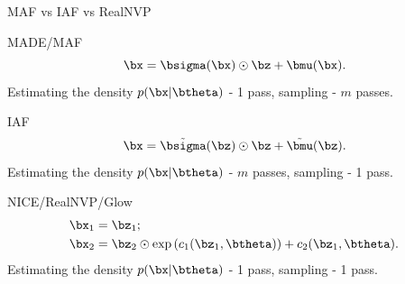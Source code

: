 \begin{frame}{MAF vs IAF vs RealNVP}
	\begin{block}{MADE/MAF}
		\vspace{-0.5cm}
		\[
		\bx = \bsigma (\bx) \odot \bz + \bmu(\bx).
		\]
		Estimating the density $p(\bx | \btheta)$ - 1 pass, sampling - $m$ passes.
	\end{block}
	\begin{block}{IAF}
		\vspace{-0.5cm}
		\[
		\bx = \tilde{\bsigma} (\bz) \odot \bz + \tilde{\bmu}(\bz).
		\]
		Estimating the density $p(\bx | \btheta)$ - $m$ passes, sampling - 1 pass.
	\end{block}
	\begin{block}{NICE/RealNVP/Glow}
		\vspace{-0.8cm}
		\begin{align*}
			\bx_1 &= \bz_1; \\ 
			\bx_2 &= \bz_2 \odot \exp \left(c_1(\bz_1, \btheta)\right) + c_2(\bz_1, \btheta).
		\end{align*}
		\vspace{-0.8cm}
		Estimating the density $p(\bx | \btheta)$ - 1 pass, sampling - 1 pass.
	\end{block}
\end{frame}
